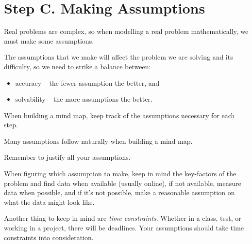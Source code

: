 \section*{Step C. Making Assumptions}\label{assumption}






Real problems are complex, so when modelling a real problem mathematically, we must make some assumptions. 

The assumptions that we make will affect the problem we are solving and its difficulty, so we need to strike a balance between:
\begin{itemize}
\item accuracy -- the fewer assumption the better, and
\item solvability -- the more assumptions the better.
\end{itemize}

\begin{annotation}
	\begin{goals}
		When building a mind map, keep track of the assumptions necessary for each step.
	\end{goals}
\end{annotation}

Many assumptions follow naturally when building a mind map. \\


\begin{annotation}
	\begin{goals}
		Remember to justify all your assumptions.
	\end{goals}
\end{annotation}
When figuring which assumption to make, keep in mind the key-factors of the problem and find data when available (usually online), if not available, measure data when possible, and if it's not possible, make a reasonable assumption on what the data might look like.

Another thing to keep in mind are \emph{time constraints}. Whether in a class, test, or working in a project, there will be deadlines. Your assumptions should take time constraints into consideration. 

\hfill \\

